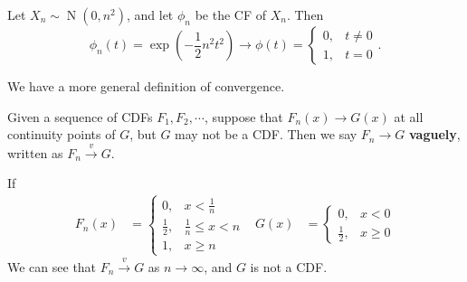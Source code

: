 \documentclass{huhtakm-template-book-v2}
\DeclareMathOperator{\N}{N}
\begin{document}
    \begin{eg}
        Let $X_{n} \sim \N(0,n^{2})$, and let $\phi_{n}$ be the CF of $X_{n}$. Then
        \begin{equation*}
            \phi_{n}(t) = \exp\left(-\frac{1}{2}n^{2}t^{2}\right) \to \phi(t) = \begin{cases}
                0, &t \neq 0\\
                1, &t = 0
            \end{cases}.
        \end{equation*}
    \end{eg}
    We have a more general definition of convergence.
    \begin{defn}
        Given a sequence of CDFs $F_{1},F_{2},\cdots$, suppose that $F_{n}(x) \to G(x)$ at all continuity points of $G$, but $G$ may not be a CDF. Then we say $F_{n} \to G$ \textbf{vaguely}, written as $F_{n} \xrightarrow{v} G$.
    \end{defn}
    \begin{eg}
        If
        \begin{align*}
            F_{n}(x) &= \begin{cases}
                0, &x < \frac{1}{n}\\
                \frac{1}{2}, &\frac{1}{n} \leq x < n\\
                1, &x \geq n
            \end{cases} & G(x) &= \begin{cases}
                0, &x < 0\\
                \frac{1}{2}, &x \geq 0
            \end{cases}
        \end{align*}
        We can see that $F_{n} \xrightarrow{v} G$ as $n \to \infty$, and $G$ is not a CDF.
    \end{eg}
    \newpage
\end{document}
